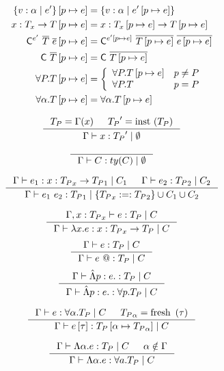 \documentclass[10pt,a4paper]{article}
\begin{document}
\begin{align*}
\left\lbrace v : \alpha\mid e'\right\rbrace \left[ p \mapsto e \right]  &= \left\lbrace v : \alpha\mid e' \left[ p \mapsto e \right] \right\rbrace\\
x : T_x \rightarrow T \left[ p \mapsto e \right]  &= x : T_x \left[ p \mapsto e \right]  \rightarrow T \left[ p \mapsto e \right] \\
\mathsf{\mathsf{C}} ^{e'} \ \overline{T} \ \overline{e} \left[ p \mapsto e \right]  
	&= \mathsf{\mathsf{C}} ^{e' \left[ p \mapsto e \right] } \ \overline{T \left[ p \mapsto e \right] } \ \overline{e \left[ p \mapsto e \right] } \\
\mathsf{\mathsf{C}} \ \overline{T} \left[ p \mapsto e \right]  
	&= \mathsf{\mathsf{C}} \ \overline{T \left[ p \mapsto e \right] }\\
\forall P . T \left[ p \mapsto e \right]  &=
	\left\{
		\begin{array}{ll}
		\forall P . T \left[ p \mapsto e \right] 	& p \neq P \\
		\forall P . T				& p = P 
		\end{array}
	\right. \\
\forall \alpha . T \left[ p \mapsto e \right]  &=
		\forall \alpha . T \left[ p \mapsto e \right] \\
\end{align*}

\hfill{}

$$
\inference{
	\pdTy = \penv(x) && \pdTy' = \pdinst{\pdTy}
}{
	\hasTypeP{\penv}{x}{\pdTy'}{\emptyset}
}[]
$$

$$
\inference{
}{
	\hasTypeP{\penv}{C}{ty(C)}{\emptyset}
}[]
$$

$$
\inference{
	\hasTypeP{\penv}{e_1}{\tfun{x}{\pdTy_x}{\pdTy_1}}{C_1} &
	\hasTypeP{\penv}{e_2}{\pdTy_2}{C_2}
}{
	\hasTypeP{\penv}{\eapp{e_1}{e_2}}{\pdTy_1}{ \{\pdTy_x :=: \pdTy_2 \} \cup C_1 \cup C_2}
}[]
$$

$$
\inference{
	\hasTypeP{\penv, x : \pdTy_x}{e}{\pdTy}{C}
}{
	\hasTypeP{\penv}{\elam{x}{e}}{\tfun{x}{\pdTy_x}{\pdTy}}{C}
}[]
$$
$$
\inference{
	\hasTypeP{\penv}{e}{\pdTy}{C}
}{
	\hasTypeP{\penv}{\epapp{e}}{\pdTy}{C}
}[]
$$
$$
\inference{
	\hasTypeP{\penv}{\eplam{p}{e}}{\pdTy}{C}
}{
	\hasTypeP{\penv}{\eplam{p}{e}}{\tforallPr{p}{\pdTy}}{C}
}[]
$$

$$
\inference{
	\hasTypeP{\penv}{e}{\tforallTy{\alpha}{\pdTy}}{C} & \pdTy_\alpha = \freshT{\tau}
}{
	\hasTypeP{\penv}{\etapp{e}{\tau}}{\pdTy \sub{\alpha}{\pdTy_\alpha}}{C}
}[]
$$

$$
\inference{
	\hasTypeP{\penv}{\etlam{\alpha}{e}}{\pdTy}{C} & \alpha \notin \penv
}{
	\hasTypeP{\penv}{\etlam{\alpha}{e}}{\tforallTy{a}{\pdTy}}{C}
}[]
$$
\end{document}
